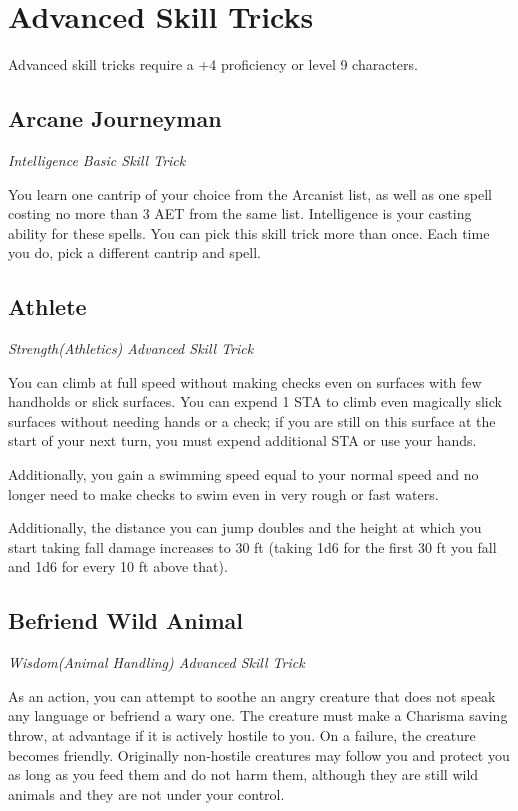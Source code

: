 \section{Advanced Skill Tricks}
\label{sec:skill-tricks-advanced}

Advanced skill tricks require a +4 proficiency or level 9 characters.

\subsection{Arcane Journeyman}

\textit{Intelligence Basic Skill Trick}

You learn one cantrip of your choice from the Arcanist list, as well as one spell costing no more than 3 AET from the same list. Intelligence is your casting ability for these spells. You can pick this skill trick more than once. Each time you do, pick a different cantrip and spell.

\subsection{Athlete}

\textit{Strength(Athletics) Advanced Skill Trick}

You can climb at full speed without making checks even on surfaces with few handholds or slick surfaces. You can expend 1 STA to climb even magically slick surfaces without needing hands or a check; if you are still on this surface at the start of your next turn, you must expend additional STA or use your hands.

Additionally, you gain a swimming speed equal to your normal speed and no longer need to make checks to swim even in very rough or fast waters.

Additionally, the distance you can jump doubles and the height at which you start taking fall damage increases to 30 ft (taking 1d6 for the first 30 ft you fall and 1d6 for every 10 ft above that).

\subsection{Befriend Wild Animal}

\textit{Wisdom(Animal Handling) Advanced Skill Trick}

As an action, you can attempt to soothe an angry creature that does not speak any language or befriend a wary one. The creature must make a Charisma saving throw, at advantage if it is actively hostile to you. On a failure, the creature becomes friendly. Originally non-hostile creatures may follow you and protect you as long as you feed them and do not harm them, although they are still wild animals and they are not under your control.

